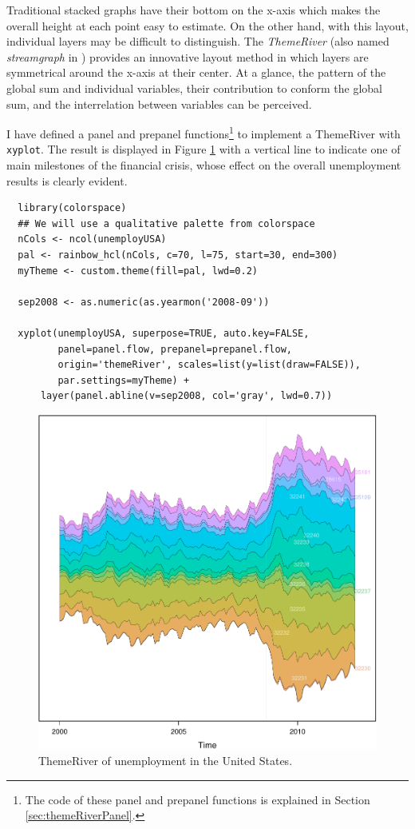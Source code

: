 \documentclass[smallroyalvopaper]{memoir}
\begin{document}
Traditional stacked graphs have their bottom on the x-axis which makes
the overall height at each point easy to estimate. On the other hand,
with this layout, individual layers may be difficult to
distinguish. The \emph{ThemeRiver} \cite{Havre.Hetzler.ea2002} (also named
\emph{streamgraph} in \cite{Byron.Wattenberg2008}) provides an innovative
layout method in which layers are symmetrical around the x-axis at
their center. At a glance, the pattern of the global sum and
individual variables, their contribution to conform the global sum,
and the interrelation between variables can be perceived.

I have defined a panel and prepanel functions\footnote{The code of these panel and prepanel functions is explained
in Section \ref{sec:themeRiverPanel}.} to implement a
ThemeRiver with \texttt{xyplot}. The result is displayed in Figure
\ref{fig:unemployUSAThemeRiver} with a vertical line to indicate
one of main milestones of the financial crisis, whose effect on
the overall unemployment results is clearly evident.
\lstset{language=r,label= ,caption= ,captionpos=b,numbers=none}
\begin{lstlisting}
  library(colorspace)
  ## We will use a qualitative palette from colorspace
  nCols <- ncol(unemployUSA)
  pal <- rainbow_hcl(nCols, c=70, l=75, start=30, end=300)
  myTheme <- custom.theme(fill=pal, lwd=0.2)
  
  sep2008 <- as.numeric(as.yearmon('2008-09'))
  
  xyplot(unemployUSA, superpose=TRUE, auto.key=FALSE,
         panel=panel.flow, prepanel=prepanel.flow,
         origin='themeRiver', scales=list(y=list(draw=FALSE)),
         par.settings=myTheme) +
      layer(panel.abline(v=sep2008, col='gray', lwd=0.7))
\end{lstlisting}

\begin{figure}[htbp]
\centering
\includegraphics[width=.9\linewidth]{figs/unemployUSAThemeRiver.pdf}
\caption{ThemeRiver of unemployment in the United States. \label{fig:unemployUSAThemeRiver}}
\end{figure}
\end{document}
